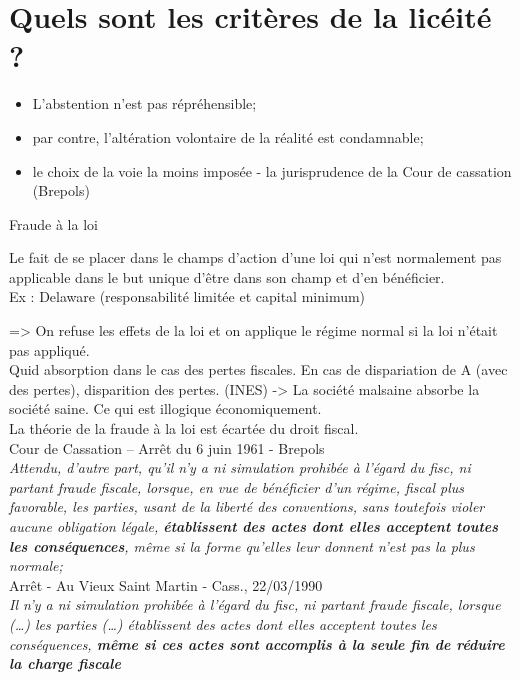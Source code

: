 \documentclass{book}
\begin{document}
\section{Quels sont les critères de la licéité ?}

\begin{itemize}
\item L'abstention n'est pas répréhensible;
\item par contre, l'altération volontaire de la réalité est condamnable;
\item le choix de la voie la moins imposée - la jurisprudence de la Cour de cassation (Brepols)
\end{itemize}

Fraude à la loi

Le fait de se placer dans le champs d'action d'une loi qui n'est normalement pas applicable dans le but unique d'être dans son champ et d'en bénéficier.\\

Ex : Delaware (responsabilité limitée et capital minimum)

=> On refuse les effets de la loi et on applique le régime normal si la loi n'était pas appliqué.\\

Quid absorption dans le cas des pertes fiscales. En cas de dispariation de A (avec des pertes), disparition des pertes. (INES) -> La société malsaine absorbe la société saine. Ce qui est illogique économiquement.\\

La théorie de la fraude à la loi est écartée du droit fiscal.\\

Cour de Cassation – Arrêt du 6 juin 1961 - Brepols\\

\textit{Attendu, d’autre part, qu’il n’y a ni simulation prohibée à l’égard du fisc, ni partant fraude fiscale, lorsque, en vue de bénéficier d’un régime, fiscal plus favorable, les parties, usant de la liberté des conventions, sans toutefois violer aucune obligation légale, \textbf{établissent des actes dont elles acceptent toutes les conséquences}, même si la forme qu’elles leur donnent n’est pas la plus normale;}\\

Arrêt - Au Vieux Saint Martin - Cass., 22/03/1990\\

\textit{Il n'y a ni simulation prohibée à l'égard du fisc, ni partant fraude fiscale, lorsque (…) les parties (…) établissent des actes dont elles acceptent toutes les conséquences,\textbf{ même si ces actes sont accomplis à la seule fin de réduire la charge fiscale}}\\
\end{document}
